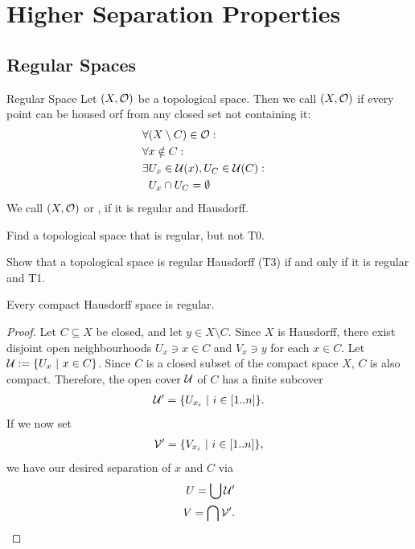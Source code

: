 \chapter{Higher Separation Properties}
\section{Regular Spaces}
\begin{importantdefinition}{Regular Space}{}
	Let $(X, \mathcal{O})$ be a topological space. Then we call $(X,\mathcal{O})$  if every point can be housed orf from any closed set not containing it:
	\begin{align*}
		\forall &(X \setminus C) \in \mathcal{O}:&\\
		\forall &x \notin C:\\
		\exists &U_x \in \mathcal{U}(x), U_C \in \mathcal{U}(C):\\
		&U_x \cap U_C = \emptyset
	\end{align*}
	We call $(X, \mathcal{O})$  or , if it is regular and Hausdorff.
\end{importantdefinition}
\begin{exercise}
	Find a topological space that is regular, but not T0.
\end{exercise}	
\begin{exercise}
	Show that a topological space is regular Hausdorff (T3) if and only if it is regular and T1.
\end{exercise}	
\begin{theorem}
	\label{th:compacthausdorffregular}
	Every compact Hausdorff space is regular.
\end{theorem}
\begin{proof}
	Let $C \subseteq X$ be closed, and let $y \in X \setminus C$. Since $X$ is Hausdorff, there exist disjoint open neighbourhoods $U_x \ni x \in C$ and $V_x \ni y$ for each $x \in C$. Let $\mathcal{U} := \qty{U_x ~\middle|~x \in C}$. Since $C$ is a closed subset of the compact space $X$, $C$ is also compact. Therefore, the open cover $\mathcal{U}$ of $C$ has a finite subcover 
	\begin{align*}
		\mathcal{U}' = \qty{U_{x_i} ~\middle|~i \in [1..n]}.
	\end{align*} 
	If we now set
	\begin{align*}
		\mathcal{V}' = \qty{V_{x_i} ~\middle|~i \in [1..n]},
	\end{align*}
	we have our desired separation of $x$ and $C$ via
	\begin{align*}
		U = \bigcup \mathcal{U}'\\
		V = \bigcap \mathcal{V}'.
	\end{align*}
\end{proof}
